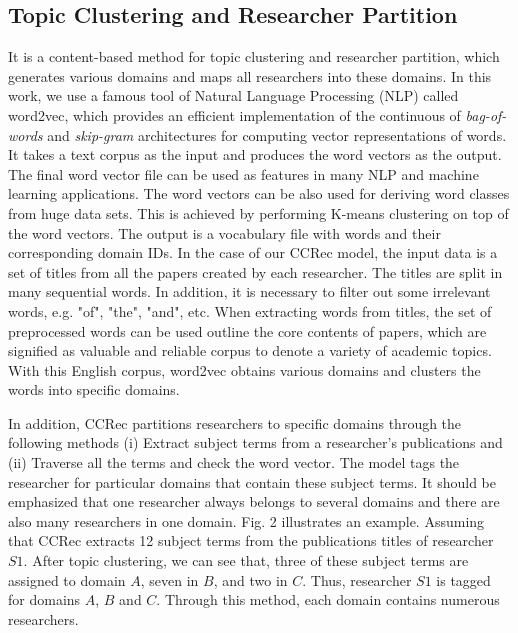 \documentclass[review]{elsarticle}
\begin{document}
\subsection{Topic Clustering and Researcher Partition}
It is a content-based method for topic clustering and researcher partition, which generates various domains and maps all researchers into these domains. In this work, we use a famous tool of Natural Language Processing (NLP) called word2vec, which provides an efficient implementation of the continuous of \emph{bag-of-words} and \emph{skip-gram} architectures for computing vector representations of words. It takes a text corpus as the input and produces the word vectors as the output. The final word vector file can be used as features in many NLP and machine learning applications. The word vectors can be also used for deriving word classes from huge data sets. This is achieved by performing K-means clustering on top of the word vectors. The output is a vocabulary file with words and their corresponding domain IDs. In the case of our CCRec model, the input data is a set of titles from all the papers created by each researcher. The titles are split in many sequential words. In addition, it is necessary to filter out some irrelevant words, e.g. "of", "the", "and", etc. When extracting words from titles, the set of preprocessed words can be used outline the core contents of papers, which are signified as valuable and reliable corpus to denote a variety of academic topics. With this English corpus, word2vec obtains various domains and clusters the words into specific domains.

In addition, CCRec partitions researchers to specific domains through the following methods (i) Extract subject terms from a researcher's publications and (ii) Traverse all the terms and check the word vector. The model tags the researcher for particular domains that contain these subject terms. It should be emphasized that one researcher always belongs to several domains and there are also many researchers in one domain. Fig. 2 illustrates an example. Assuming that CCRec extracts 12 subject terms from the publications titles of researcher $S1$. After topic clustering, we can see that, three of these subject terms are assigned to domain $A$, seven in $B$, and two in $C$. Thus, researcher $S1$ is tagged for domains $A$, $B$ and $C$. Through this method, each domain contains numerous researchers.
\end{document}
